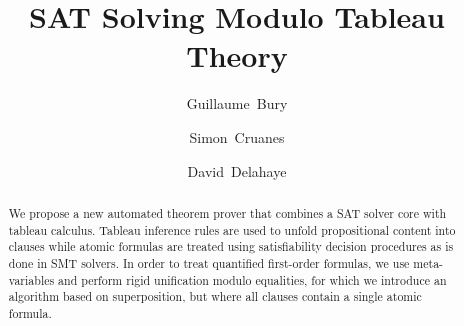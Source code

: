 \documentclass{llncs}
\begin{document}
\title{SAT Solving Modulo Tableau Theory}

\author{Guillaume~Bury \and Simon~Cruanes \and
David~Delahaye}


\maketitle

\begin{abstract}
We propose a new automated theorem prover that combines a SAT solver core with
tableau calculus. Tableau inference rules are used to unfold propositional
content into clauses while atomic formulas are treated using satisfiability
decision procedures as is done in SMT solvers. In order to treat quantified
first-order formulas, we use meta-variables and perform rigid unification modulo
equalities, for which we introduce an algorithm based on superposition, but
where all clauses contain a single atomic formula.

\end{abstract}










\end{document}
